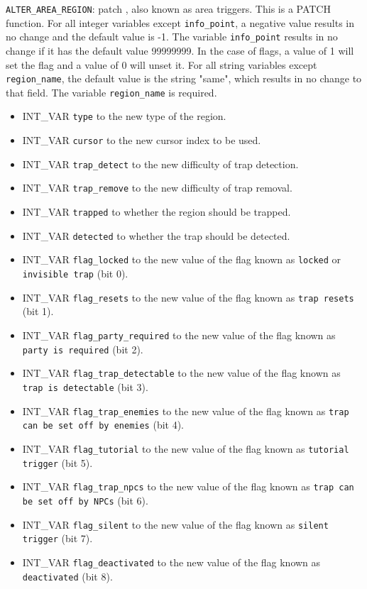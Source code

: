 \documentclass{article}
\def\t#1{{\tt #1}}
\begin{document}
\verb+ALTER_AREA_REGION+: patch , also known as area triggers.
This is a PATCH function. For all integer variables except \verb+info_point+, a negative value results in no change and the default value is -1. The variable \verb+info_point+ results in no change if it has the default value 99999999. In the case of flags, a value of 1 will set the flag and a value of 0 will unset it. For all string variables except \verb+region_name+, the default value is the string "same", which results in no change to that field. The variable \verb+region_name+ is required.
\begin{itemize}
\item INT_VAR \verb+type+ to the new type of the region.
\item INT_VAR \verb+cursor+ to the new cursor index to be used.
\item INT_VAR \verb+trap_detect+ to the new difficulty of trap detection.
\item INT_VAR \verb+trap_remove+ to the new difficulty of trap removal.
\item INT_VAR \verb+trapped+ to whether the region should be trapped.
\item INT_VAR \verb+detected+ to whether the trap should be detected.
\item INT_VAR \verb+flag_locked+ to the new value of the flag known as \t{locked} or \t{invisible trap} (bit 0).
\item INT_VAR \verb+flag_resets+ to the new value of the flag known as \t{trap resets} (bit 1).
\item INT_VAR \verb+flag_party_required+ to the new value of the flag known as \t{party is required} (bit 2).
\item INT_VAR \verb+flag_trap_detectable+ to the new value of the flag known as \t{trap is detectable} (bit 3).
\item INT_VAR \verb+flag_trap_enemies+ to the new value of the flag known as \t{trap can be set off by enemies} (bit 4).
\item INT_VAR \verb+flag_tutorial+ to the new value of the flag known as \t{tutorial trigger} (bit 5).
\item INT_VAR \verb+flag_trap_npcs+ to the new value of the flag known as \t{trap can be set off by NPCs} (bit 6).
\item INT_VAR \verb+flag_silent+ to the new value of the flag known as \t{silent trigger} (bit 7).
\item INT_VAR \verb+flag_deactivated+ to the new value of the flag known as \t{deactivated} (bit 8).

\end{itemize}
\end{document}
